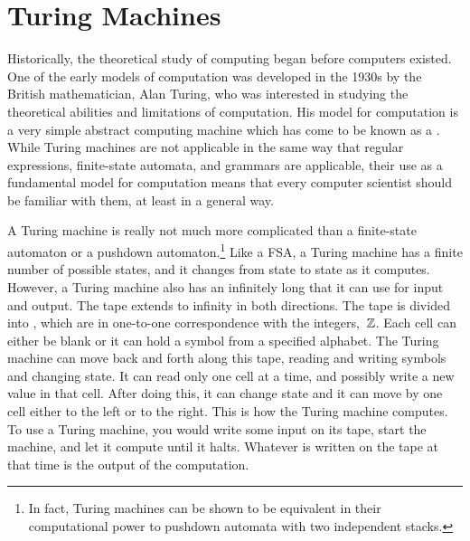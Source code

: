 \section{Turing Machines}\label{S-turing-1}

Historically, the theoretical study of computing began before computers
existed.  One of the early models of computation was developed in the
1930s by the British mathematician, Alan Turing, who was interested in
studying the theoretical abilities and limitations of computation.
His model for computation is a very simple abstract computing machine
which has come to be known as a .  While Turing
machines are not applicable in the same way that regular expressions,
finite-state automata, and grammars are applicable, their use as a
fundamental model for computation means that every computer scientist
should be familiar with them, at least in a general way.

A Turing machine is really not much more complicated than a finite-state 
automaton or a pushdown automaton.\footnote{In fact, Turing machines can
be shown to be equivalent in their computational power
to pushdown automata with two independent stacks.}
Like a FSA, a Turing machine has a finite number of 
possible states, and it changes from state to state as it computes.
However, a Turing machine also has an infinitely long 
that it can use for input and output.  The tape extends to infinity in
both directions.  The tape is divided into , which
are in one-to-one correspondence with the
integers,~${\mathbb Z}$. Each cell can either be blank or it can hold a symbol from
a specified alphabet.  The Turing machine can move back and forth
along this tape, reading and writing symbols and changing state.
It can read only one cell at a time, and possibly write a new
value in that cell.  After doing this, it can change state and
it can move by one cell either to the left or to the right.
This is how the Turing machine computes.  To use a Turing machine,
you would write some input on its tape, start the machine, and let
it compute until it halts.  Whatever is written on the tape at that
time is the output of the computation.

